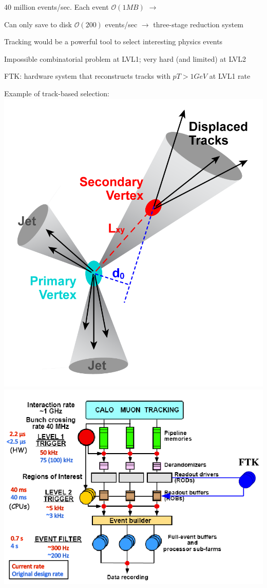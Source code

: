 {
\centering
\iteb
\item 40 million events/sec. Each event $\mathcal{O}(1MB)$ $\rightarrow$ 
\item Can only save to disk $\mathcal{O}(200)$ events/sec $\rightarrow$ three-stage reduction system
\item Tracking would be a powerful tool to select interesting physics events
\iteb
\item Impossible combinatorial problem at LVL1; very hard (and limited) at LVL2
\itee
\item FTK: hardware system that reconstructs tracks with $pT>1 GeV$ at LVL1 rate
\itee

\colb[T]
\centering
\tiny{Example of track-based selection}:
\includegraphics[width=.8\textwidth]{dates/mtg/figures/atlas/btag}
\centering
\includegraphics[width=1.0\textwidth]{dates/mtg/figures/atlas/trigger}
\cole

}

